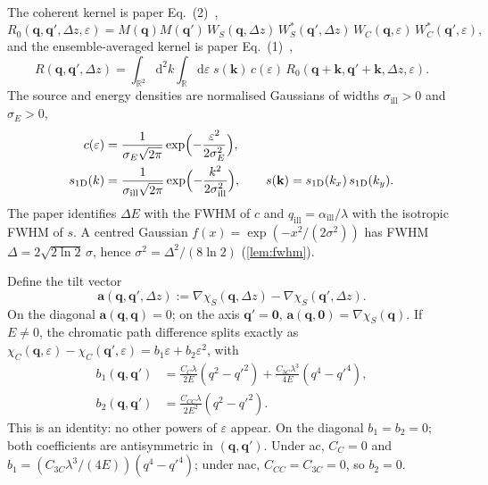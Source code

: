 \documentclass[11pt,a4paper]{article}
\theoremstyle{definition}
\theoremstyle{remark}
\newcommand{\R}{\mathbb{R}}
\newcommand{\dd}{\mathrm{d}}
\newcommand{\qill}{q_{\mathrm{ill}}}
\newcommand{\sill}{\sigma_{\mathrm{ill}}}
\newcommand{\sE}{\sigma_E}
\newcommand{\DE}{\Delta E}
\newcommand{\Dz}{\Delta z}
\newcommand{\Rzero}{R_{0}}
\begin{document}
The coherent kernel is paper Eq.~(2)~\cite{Yu2019},
\begin{equation}
\label{eq:R0}
\Rzero(\mathbf{q},\mathbf{q}',\Dz,\varepsilon)
=M(\mathbf{q})M(\mathbf{q}')
\,W_S(\mathbf{q},\Dz)\,W_S^*(\mathbf{q}',\Dz)
\,W_C(\mathbf{q},\varepsilon)\,W_C^*(\mathbf{q}',\varepsilon),
\end{equation}
and the ensemble-averaged kernel is paper Eq.~(1)~\cite{Yu2019},
\begin{equation}
\label{eq:R}
R(\mathbf{q},\mathbf{q}',\Dz)
=\int_{\R^2}\dd^2k\int_{\R}\dd\varepsilon\;
s(\mathbf{k})\,c(\varepsilon)\,
\Rzero(\mathbf{q}+\mathbf{k},\mathbf{q}'+\mathbf{k},\Dz,\varepsilon).
\end{equation}
The source and energy densities are normalised Gaussians of widths
$\sill>0$ and $\sE>0$,
\begin{equation}
\label{eq:cs}
\begin{aligned}
c(\varepsilon)
&=\frac{1}{\sE\sqrt{2\pi}}
\exp\Bigl(-\frac{\varepsilon^2}{2\sE^2}\Bigr),\\
s_{1\mathrm{D}}(k)
&=\frac{1}{\sill\sqrt{2\pi}}
\exp\Bigl(-\frac{k^2}{2\sill^2}\Bigr),
\qquad
s(\mathbf{k})
=s_{1\mathrm{D}}(k_x)\,s_{1\mathrm{D}}(k_y).
\end{aligned}
\end{equation}
The paper identifies $\DE$ with the FWHM of $c$ and
$\qill=\alpha_{\mathrm{ill}}/\lambda$ with the isotropic FWHM of $s$.
A centred Gaussian $f(x)=\exp(-x^2/(2\sigma^2))$ has
FWHM $\Delta=2\sqrt{2\ln 2}\,\sigma$, hence
$\sigma^2=\Delta^2/(8\ln 2)$ (\cref{lem:fwhm}).

Define the tilt vector
\begin{equation}
\label{eq:a}
\mathbf{a}(\mathbf{q},\mathbf{q}',\Dz)
:=\nabla\chi_S(\mathbf{q},\Dz)-\nabla\chi_S(\mathbf{q}',\Dz).
\end{equation}
On the diagonal $\mathbf{a}(\mathbf{q},\mathbf{q})=0$; on the axis
$\mathbf{q}'=\mathbf{0}$, $\mathbf{a}(\mathbf{q},\mathbf{0})=\nabla\chi_S(\mathbf{q})$.
If $E\neq 0$, the chromatic path difference splits exactly as
$\chi_C(\mathbf{q},\varepsilon)-\chi_C(\mathbf{q}',\varepsilon)
=b_1\varepsilon+b_2\varepsilon^2$, with
\begin{equation}
\label{eq:b1b2}
\begin{aligned}
b_1(\mathbf{q},\mathbf{q}')
&=\frac{C_C\lambda}{2E}(q^2-{q'}^2)
+\frac{C_{3C}\lambda^3}{4E}(q^4-{q'}^4),\\
b_2(\mathbf{q},\mathbf{q}')
&=\frac{C_{CC}\lambda}{2E^2}(q^2-{q'}^2).
\end{aligned}
\end{equation}
This is an identity: no other powers of $\varepsilon$ appear.
On the diagonal $b_1=b_2=0$; both coefficients are antisymmetric in
$(\mathbf{q},\mathbf{q}')$.
Under ac, $C_C=0$ and $b_1=(C_{3C}\lambda^3/(4E))(q^4-{q'}^4)$;
under nac, $C_{CC}=C_{3C}=0$, so $b_2=0$.
\end{document}
